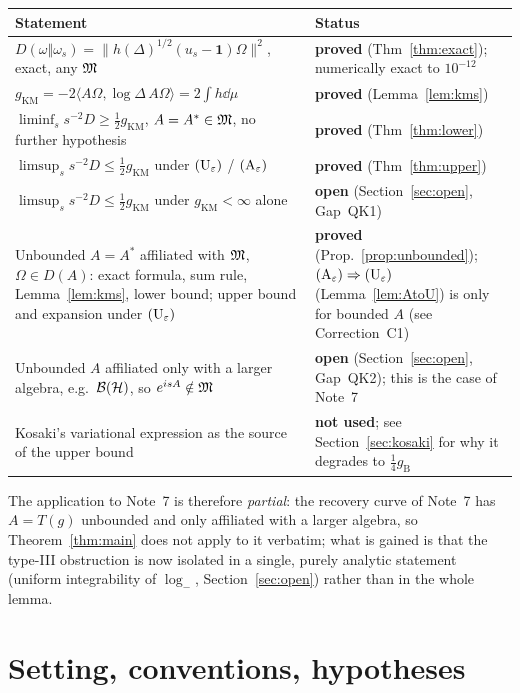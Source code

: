\documentclass[11pt]{article}
\newcommand{\Hil}{\mathcal H}\newcommand{\Om}{\Omega}
\newcommand{\ip}[2]{\langle#1,#2\rangle}\newcommand{\norm}[1]{\lVert#1\rVert}
\newcommand{\gKM}{g_{\mathrm{KM}}}\newcommand{\gB}{g_{\mathrm B}}
\newcommand{\one}{\mathbf 1}\newcommand{\dist}{\operatorname{dist}}
\begin{document}
\begin{center}\small
\begin{tabular}{@{}p{}p{}@{}}\toprule
\textbf{Statement} & \textbf{Status}\\\midrule
$D(\omega\Vert\omega_s)=\norm{h(\Delta)^{1/2}(u_s-\one)\Om}^2$, exact, any $\mathfrak M$ &
 \textbf{proved} (Thm~\ref{thm:exact}); numerically exact to $10^{-12}$\\
$\gKM=-2\ip{A\Om}{\log\Delta\,A\Om}=2\int h\dd\mu$ &
 \textbf{proved} (Lemma~\ref{lem:kms})\\
$\liminf_s s^{-2}D\ge\frac12\gKM$, $A=A^*\in\mathfrak M$, no further hypothesis &
 \textbf{proved} (Thm~\ref{thm:lower})\\
$\limsup_s s^{-2}D\le\frac12\gKM$ under $(\mathrm U_\varepsilon)$ / $(\mathrm A_\varepsilon)$ &
 \textbf{proved} (Thm~\ref{thm:upper})\\
$\limsup_s s^{-2}D\le\frac12\gKM$ under $\gKM<\infty$ alone &
 \textbf{open} (Section~\ref{sec:open}, Gap~QK1)\\
Unbounded $A=A^*$ affiliated with $\mathfrak M$, $\Om\in D(A)$: exact formula, sum rule, Lemma~\ref{lem:kms}, lower bound; upper bound and expansion under $(\mathrm U_\varepsilon)$ & \textbf{proved} (Prop.~\ref{prop:unbounded}); $(\mathrm A_\varepsilon)\Rightarrow(\mathrm U_\varepsilon)$ (Lemma~\ref{lem:AtoU}) is only for bounded $A$ (see Correction~C1)\\
Unbounded $A$ affiliated only with a larger algebra, e.g.\ $\cB(\Hil)$, so $e^{isA}\notin\mathfrak M$ & \textbf{open} (Section~\ref{sec:open}, Gap~QK2); this is the case of Note~7\\
Kosaki's variational expression as the source of the upper bound &
 \textbf{not used}; see Section~\ref{sec:kosaki} for why it degrades to $\tfrac14\gB$\\\bottomrule
\end{tabular}
\end{center}

The application to Note~7 is therefore \emph{partial}: the recovery curve of Note~7 has
$A=T(g)$ unbounded and only affiliated with a larger algebra, so Theorem~\ref{thm:main} does not apply to it
verbatim; what is gained is that the type-III obstruction is now isolated in a single, purely analytic
statement (uniform integrability of $\log_-$, Section~\ref{sec:open}) rather than in the whole lemma.

\section{Setting, conventions, hypotheses}\label{sec:setting}
\end{document}
